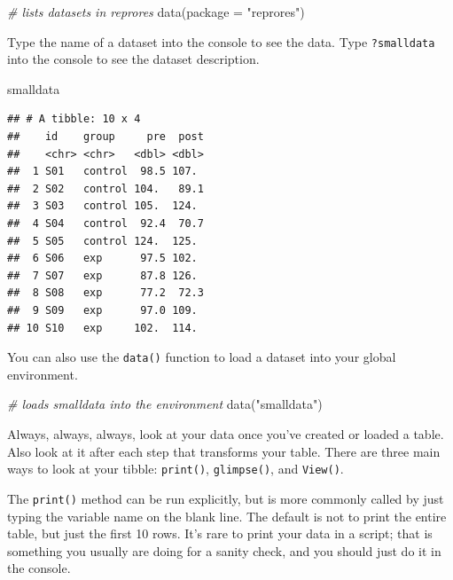 \documentclass[
  oneside]{book}
\newenvironment{Shaded}{\begin{snugshade}}{\end{snugshade}}
\newcommand{\AttributeTok}[1]{\textcolor[rgb]{0.77,0.63,0.00}{#1}}
\newcommand{\CommentTok}[1]{\textcolor[rgb]{0.56,0.35,0.01}{\textit{#1}}}
\newcommand{\FunctionTok}[1]{\textcolor[rgb]{0.00,0.00,0.00}{#1}}
\newcommand{\NormalTok}[1]{#1}
\newcommand{\StringTok}[1]{\textcolor[rgb]{0.31,0.60,0.02}{#1}}
\begin{document}
\begin{Shaded}
\begin{Highlighting}[]
\CommentTok{\# lists datasets in reprores}
\FunctionTok{data}\NormalTok{(}\AttributeTok{package =} \StringTok{"reprores"}\NormalTok{)}
\end{Highlighting}
\end{Shaded}

Type the name of a dataset into the console to see the data. Type \texttt{?smalldata} into the console to see the dataset description.

\begin{Shaded}
\begin{Highlighting}[]
\NormalTok{smalldata}
\end{Highlighting}
\end{Shaded}

\begin{verbatim}
## # A tibble: 10 x 4
##    id    group     pre  post
##    <chr> <chr>   <dbl> <dbl>
##  1 S01   control  98.5 107. 
##  2 S02   control 104.   89.1
##  3 S03   control 105.  124. 
##  4 S04   control  92.4  70.7
##  5 S05   control 124.  125. 
##  6 S06   exp      97.5 102. 
##  7 S07   exp      87.8 126. 
##  8 S08   exp      77.2  72.3
##  9 S09   exp      97.0 109. 
## 10 S10   exp     102.  114.
\end{verbatim}

You can also use the \texttt{data()} function to load a dataset into your global environment.

\begin{Shaded}
\begin{Highlighting}[]
\CommentTok{\# loads smalldata into the environment}
\FunctionTok{data}\NormalTok{(}\StringTok{"smalldata"}\NormalTok{)}
\end{Highlighting}
\end{Shaded}

Always, always, always, look at your data once you've created or loaded a table. Also look at it after each step that transforms your table. There are three main ways to look at your tibble: \texttt{print()}, \texttt{glimpse()}, and \texttt{View()}.

The \texttt{print()} method can be run explicitly, but is more commonly called by just typing the variable name on the blank line. The default is not to print the entire table, but just the first 10 rows. It's rare to print your data in a script; that is something you usually are doing for a sanity check, and you should just do it in the console.
\end{document}
